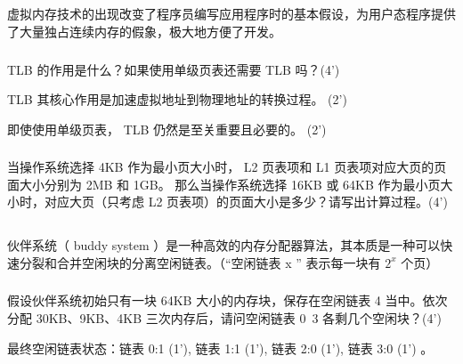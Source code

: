 \documentclass[a4paper,12pt]{article}
\newcommand{\score}[1]{(#1')}
\begin{document}
\subsection{}

虚拟内存技术的出现改变了程序员编写应用程序时的基本假设，为用户态程序提供了大量独占连续内存的假象，极大地方便了开发。

\subsubsection{}

TLB 的作用是什么？如果使用单级页表还需要 TLB 吗？\score{4}

\begin{answer}
  TLB 其核心作用是​​加速虚拟地址到物理地址的转换过程。 \score{2}

  即使使用单级页表， TLB 仍然是至关重要且必要的。 \score{2}
\end{answer}

\subsubsection{}

当操作系统选择 4KB 作为最小页大小时， L2 页表项和 L1 页表项对应大页的页面大小分别为 2MB 和 1GB。
那么当操作系统选择 16KB 或 64KB 作为最小页大小时，对应大页（只考虑 L2 页表项）的页面大小是多少？请写出计算过程。\score{4}

\begin{answer}
  \lipsum[3]
\end{answer}

\subsection{}

伙伴系统（ buddy system ）是一种高效的内存分配器算法，其本质是一种可以快速分裂和合并空闲块的分离空闲链表。（“空闲链表 x ” 表示每一块有 $2^{x}$ 个页）

\subsubsection{}

假设伙伴系统初始只有一块 64KB 大小的内存块，保存在空闲链表 4 当中。依次分配 30KB、9KB、4KB 三次内存后，请问空闲链表 0~3 各剩几个空闲块？\score{4}

\begin{answer}
  最终空闲链表状态：链表 0:1 \score{1}, 链表 1:1 \score{1}, 链表 2:0 \score{1}, 链表 3:0 \score{1} 。
\end{answer}
\end{document}
